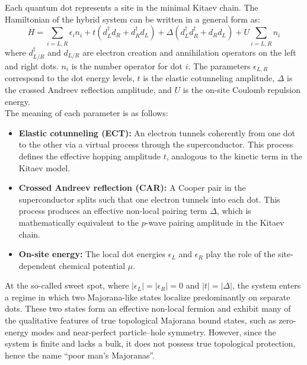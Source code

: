 Each quantum dot represents a site in the minimal Kitaev chain. The Hamiltonian of the hybrid system can be written in a general form as:
\begin{equation}
H = \sum_{i=L,R} \epsilon_i n_i
+ t (d_L^\dagger d_R + d_R^\dagger d_L)
+ \Delta (d_L^\dagger d_R^\dagger + d_R d_L)
+ U \sum_{i=L,R} n_i
\label{eq:qdsqdh}
\end{equation}
where $d_{L/R}^\dagger$ and $d_{L/R}$ are electron creation and annihilation operators on the left and right dots. $n_i$ is the number operator for dot $i$. The parameters $ϵ_{L,R}$ correspond to the dot energy levels, $t$ is the elastic cotunneling amplitude, $Δ$ is the crossed Andreev reflection amplitude, and $U$ is the on-site Coulomb repulsion energy.\\
The meaning of each parameter is as follows:
\begin{itemize}
    \item \textbf{Elastic cotunneling (ECT):} An electron tunnels coherently from one dot to the other via a virtual process through the superconductor. This process defines the effective hopping amplitude $t$, analogous to the kinetic term in the Kitaev model.
    \item \textbf{Crossed Andreev reflection (CAR):} A Cooper pair in the superconductor splits such that one electron tunnels into each dot. This process produces an effective non-local pairing term $\Delta$, which is mathematically equivalent to the $p$-wave pairing amplitude in the Kitaev chain.
    \item \textbf{On-site energy:} The local dot energies $\epsilon_L$ and $\epsilon_R$ play the role of the site-dependent chemical potential $\mu$.
\end{itemize}
At the so-called sweet spot, where $|\epsilon_L| = |\epsilon_R| = 0$ and $|t| = |\Delta|$, the system enters a regime in which two Majorana-like states localize predominantly on separate dots. These two states form an effective non-local fermion and exhibit many of the qualitative features of true topological Majorana bound states, such as zero-energy modes and near-perfect particle–hole symmetry. However, since the system is finite and lacks a bulk, it does not possess true topological protection, hence the name “poor man’s Majoranas”. \cite{Qtech}

